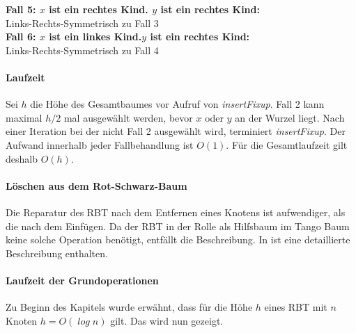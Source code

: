 \documentclass[a4paper,12pt]{article}
\begin{document}
\noindent\textbf{Fall 5: $x$ ist ein rechtes Kind. $y$ ist ein rechtes Kind: }\\ 
Links-Rechts-Symmetrisch zu Fall 3\\
\noindent\textbf{Fall 6:  $x$ ist ein linkes Kind.$y$ ist ein rechtes Kind: }\\ 
Links-Rechts-Symmetrisch zu Fall 4\\


\paragraph{Laufzeit}
\noindent  Sei $h$ die Höhe des Gesamtbaumes vor Aufruf von \textit{insertFixup}. Fall 2 kann maximal $h / 2$ mal ausgewählt werden, bevor $x$ oder $y$ an der Wurzel liegt. Nach einer Iteration bei der nicht Fall 2 ausgewählt wird, terminiert \textit{insertFixup}. Der Aufwand innerhalb jeder Fallbehandlung ist $O(1)$. Für die Gesamtlaufzeit gilt deshalb $\mathit{O(h)}$.


  
\paragraph{Löschen aus dem Rot-Schwarz-Baum}
Die Reparatur des RBT nach dem Entfernen eines Knotens ist aufwendiger, als die nach dem Einfügen. Da der RBT in der Rolle als Hilfsbaum im Tango Baum keine solche Operation benötigt, entfällt die Beschreibung. In \cite{algEinf} ist eine detaillierte Beschreibung enthalten. 
\paragraph{Laufzeit der Grundoperationen}
Zu Beginn des Kapitels wurde erwähnt, dass für die Höhe $h$ eines RBT mit $n$ Knoten $h = \mathit{O(\log {n})}$  gilt. Das wird nun gezeigt. 
\end{document}
